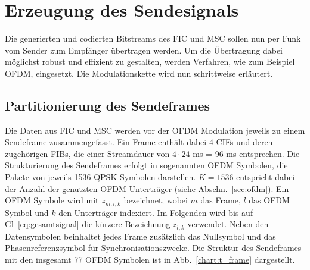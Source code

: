\section{Erzeugung des Sendesignals}
\label{sec:ofdm_mod}
Die generierten und codierten Bitstreams des FIC und MSC sollen nun per Funk vom Sender zum Empfänger übertragen werden. Um die Übertragung dabei möglichst robust und effizient zu gestalten, werden Verfahren, wie zum Beispiel \ac{OFDM}, eingesetzt. Die Modulationskette wird nun schrittweise erläutert.

\subsection{Partitionierung des Sendeframes}
\label{sec:transmission_frame}
Die Daten aus FIC und MSC werden vor der OFDM Modulation jeweils zu einem Sendeframe zusammengefasst. Ein Frame enthält dabei $4$ CIFs und deren zugehörigen FIBs, die einer Streamdauer von $4\cdot24$ ms = 96 ms entsprechen. Die Strukturierung des Sendeframes erfolgt in sogenannten OFDM Symbolen, die Pakete von jeweils 1536 QPSK Symbolen darstellen. $K=1536$ entspricht dabei der Anzahl der genutzten OFDM Unterträger (siehe Abschn.~\ref{sec:ofdm}). Ein OFDM Symbole wird mit $z_{m,l,k}$ bezeichnet, wobei $m$ das Frame, $l$ das OFDM Symbol und $k$ den Unterträger indexiert. Im Folgenden wird bis auf Gl~\ref{eq:gesamtsignal} die kürzere Bezeichnung $z_{l,k}$ verwendet. Neben den Datensymbolen beinhaltet jedes Frame zusätzlich das Nullsymbol und das Phasenreferenzsymbol für Synchronisationszwecke. Die Struktur des Sendeframes mit den insgesamt 77 OFDM Symbolen ist in Abb.~\ref{chart:t_frame} dargestellt.

